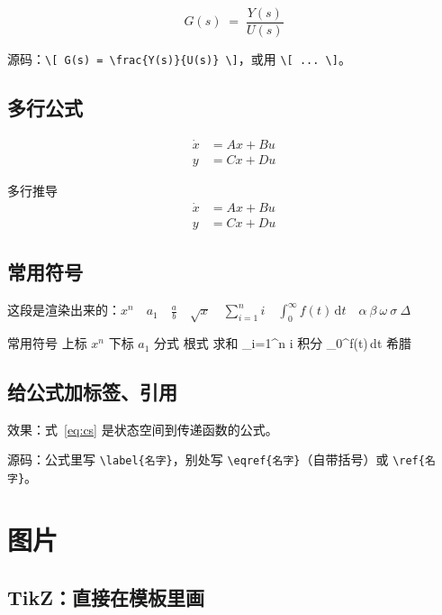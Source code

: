 \[ G(s) \;=\; \frac{Y(s)}{U(s)} \]

源码：\texttt{\textbackslash[\ G(s) = \textbackslash frac\{Y(s)\}\{U(s)\}\ \textbackslash]}，或用 \texttt{\textbackslash [ ... \textbackslash ]}。

\subsection{多行公式}

\begin{align}
  \dot{x} &= Ax + Bu \\
  y      &= Cx + Du
\end{align}

\begin{codebox}[latex]{多行推导}
\begin{align}
  \dot{x} &= Ax + Bu \\
  y      &= Cx + Du
\end{align}
\end{codebox}

\subsection{常用符号}

这段是渲染出来的：$x^n$　$a_1$　$\frac{a}{b}$　$\sqrt{x}$　$\sum_{i=1}^{n} i$　$\int_0^\infty f(t)\,\mathrm{d}t$　$\alpha\ \beta\ \omega\ \sigma\ \Delta$

\begin{codebox}[latex]{常用符号}
上标 $x^n$     下标 $a_1$
分式    根式 
求和 \sum_{i=1}^{n} i   积分 \int_0^\infty f(t)\,dt
希腊 \alpha \beta \omega \sigma \Delta
\end{codebox}

\subsection{给公式加标签、引用}

效果：式~\eqref{eq:cs} 是状态空间到传递函数的公式。

源码：公式里写 \texttt{\textbackslash label\{名字\}}，别处写 \texttt{\textbackslash eqref\{名字\}}（自带括号）或 \texttt{\textbackslash ref\{名字\}}。

\section{图片}

\subsection{TikZ：直接在模板里画}

